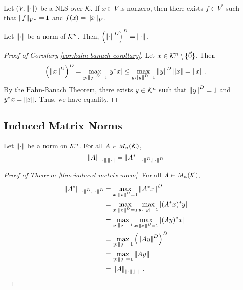 \begin{fact}
\label{fact:hahn-banach-thm}
Let $(V, \left\lVert\cdot\right\rVert)$ be a NLS over $\mathcal{K}$. If $x \in V$ is nonzero, then there exists $f \in V^*$ such that $\left\lVert f\right\rVert_{V^*} = 1$ and $f(x) = \left\lVert x\right\rVert_V$.
\end{fact}

\begin{corollary}
\label{cor:hahn-banach-corollary}
Let $\left\lVert\cdot\right\rVert$ be a norm of $\mathcal{K}^n$. Then, $\left(\left\lVert\cdot\right\rVert^D\right)^D = \left\lVert\cdot\right\rVert$.
\end{corollary}

\begin{proof}[Proof of Corollary \ref{cor:hahn-banach-corollary}]
Let $x \in \mathcal{K}^n \setminus\{\Vec{0}\}$. Then
$$
\left(\left\lVert x\right\rVert^D\right)^D = \max_{y:\left\lVert y\right\rVert^D = 1} |y^*x| \leq \max_{y:\left\lVert y\right\rVert^D = 1} \left\lVert y\right\rVert^D \left\lVert x\right\rVert = \left\lVert x\right\rVert.
$$
By the Hahn-Banach Theorem, there exists $y \in \mathcal{K}^n$ such that $\left\lVert y\right\rVert^D = 1$ and $y^*x = \left\lVert x\right\rVert$. Thus, we have equality.
\end{proof}


\subsection{Induced Matrix Norms}
\begin{theorem}
\label{thm:induced-matrix-norm}
Let $\left\lVert\cdot\right\rVert$ be a norm on $\mathcal{K}^n$. For all $A \in M_n(\mathcal{K})$,
$$
\left\lVert A\right\rVert_{\left\lVert\cdot\right\rVert, \left\lVert\cdot\right\rVert} = \left\lVert A^*\right\rVert_{\left\lVert\cdot\right\rVert^D, \left\lVert\cdot\right\rVert^D}
$$
\end{theorem}

\begin{proof}[Proof of Theorem \ref{thm:induced-matrix-norm}]
For all $A \in M_n(\mathcal{K})$, 
\begin{align*}
    \left\lVert A^*\right\rVert_{\left\lVert\cdot\right\rVert^D, \left\lVert\cdot\right\rVert^D} 
        &= \max_{x:\left\lVert x\right\rVert^D = 1} \left\lVert A^*x\right\rVert^D \\
        &= \max_{x:\left\lVert x\right\rVert^D = 1} \max_{y:\left\lVert y\right\rVert=1} |(A^*x)^*y| \\
        &= \max_{y:\left\lVert y\right\rVert=1} \max_{x:\left\lVert x\right\rVert^D=1} |(Ay)^*x| \\
        &= \max_{y:\left\lVert y\right\rVert=1} \left(\left\lVert Ay\right\rVert^D\right)^D \\
        &= \max_{y:\left\lVert y\right\rVert=1} \left\lVert Ay\right\rVert \\
        &= \left\lVert A\right\rVert_{\left\lVert\cdot\right\rVert, \left\lVert\cdot\right\rVert}.
\end{align*}
\end{proof}

